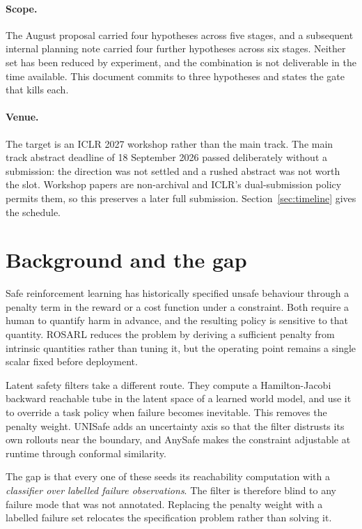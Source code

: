 \documentclass[11pt,a4paper]{article}
\begin{document}
\paragraph{Scope.} The August proposal carried four hypotheses across five stages, and a
subsequent internal planning note carried four further hypotheses across six stages. Neither
set has been reduced by experiment, and the combination is not deliverable in the time
available. This document commits to three hypotheses and states the gate that kills each.

\paragraph{Venue.} The target is an ICLR 2027 workshop rather than the main track. The main
track abstract deadline of 18 September 2026 passed deliberately without a submission: the
direction was not settled and a rushed abstract was not worth the slot. Workshop papers are
non-archival and ICLR's dual-submission policy permits them, so this preserves a later full
submission. Section~\ref{sec:timeline} gives the schedule.

\section{Background and the gap}

Safe reinforcement learning has historically specified unsafe behaviour through a penalty
term in the reward or a cost function under a constraint. Both require a human to quantify
harm in advance, and the resulting policy is sensitive to that quantity. ROSARL
\parencite{nanguetasse2023rosarl} reduces the problem by deriving a sufficient penalty from
intrinsic quantities rather than tuning it, but the operating point remains a single scalar
fixed before deployment.

Latent safety filters \parencite{nakamura2025generalizing} take a different route. They
compute a Hamilton-Jacobi backward reachable tube \parencite{bansal2017hamilton} in the
latent space of a learned world model, and use it to override a task policy when failure
becomes inevitable. This removes the penalty weight. UNISafe \parencite{seo2025unisafe} adds
an uncertainty axis so that the filter distrusts its own rollouts near the boundary, and
AnySafe \parencite{agrawal2025anysafe} makes the constraint adjustable at runtime through
conformal similarity.

The gap is that every one of these seeds its reachability computation with a
\emph{classifier over labelled failure observations}. The filter is therefore blind to any
failure mode that was not annotated. Replacing the penalty weight with a labelled failure set
relocates the specification problem rather than solving it.
\end{document}
